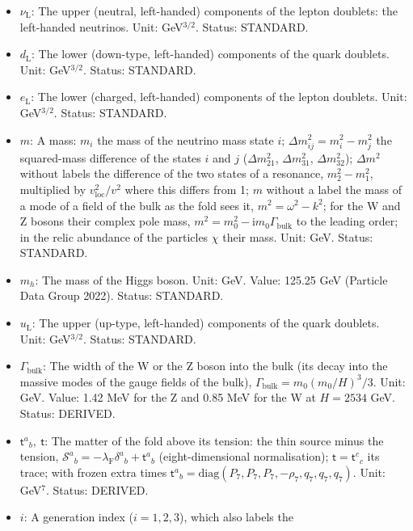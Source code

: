 \documentclass[
  10pt,
]{article}
\begin{document}
\begin{itemize}
  entries. Status: STANDARD.
\item
  \(\nu_{\mathrm{L}}\): The upper (neutral, left-handed) components of
  the lepton doublets: the left-handed neutrinos. Unit: GeV\(^{3/2}\).
  Status: STANDARD.
\item
  \(d_{\mathrm{L}}\): The lower (down-type, left-handed) components of
  the quark doublets. Unit: GeV\(^{3/2}\). Status: STANDARD.
\item
  \(e_{\mathrm{L}}\): The lower (charged, left-handed) components of the
  lepton doublets. Unit: GeV\(^{3/2}\). Status: STANDARD.
\item
  \(m\): A mass: \(m_i\) the mass of the neutrino mass state \(i\);
  \(\Delta m_{ij}^2 = m_i^2 - m_j^2\) the squared-mass difference of the
  states \(i\) and \(j\) (\(\Delta m_{21}^2\), \(\Delta m_{31}^2\),
  \(\Delta m_{32}^2\)); \(\Delta m^2\) without labels the difference of
  the two states of a resonance, \(m_2^2 - m_1^2\), multiplied by
  \(v_{\mathrm{loc}}^2/v^2\) where this differs from 1; \(m\) without a
  label the mass of a mode of a field of the bulk as the fold sees it,
  \(m^2 = \omega^2 - k^2\); for the W and Z bosons their complex pole
  mass, \(m^2 = m_0^2 - \mathrm{i}m_0\Gamma_{\mathrm{bulk}}\) to the
  leading order; in the relic abundance of the particles \(\chi\) their
  mass. Unit: GeV. Status: STANDARD.
\item
  \(m_h\): The mass of the Higgs boson. Unit: GeV. Value: 125.25 GeV
  (Particle Data Group 2022). Status: STANDARD.
\item
  \(u_{\mathrm{L}}\): The upper (up-type, left-handed) components of the
  quark doublets. Unit: GeV\(^{3/2}\). Status: STANDARD.
\item
  \(\Gamma_{\mathrm{bulk}}\): The width of the W or the Z boson into the
  bulk (its decay into the massive modes of the gauge fields of the
  bulk), \(\Gamma_{\mathrm{bulk}} = m_0(m_0/H)^3/3\). Unit: GeV. Value:
  1.42 MeV for the Z and 0.85 MeV for the W at \(H = 2534\) GeV. Status:
  DERIVED.
\item
  \(\mathsf{t}^a{}_b,\ \mathsf{t}\): The matter of the fold above its
  tension: the thin source minus the tension,
  \(\mathcal{S}^a{}_b = -\lambda_{\mathrm{F}}\delta^a{}_b + \mathsf{t}^a{}_b\)
  (eight-dimensional normalisation); \(\mathsf{t} = \mathsf{t}^c{}_c\)
  its trace; with frozen extra times
  \(\mathsf{t}^a{}_b = \mathrm{diag}(P_7, P_7, P_7, -\rho_7, q_7, q_7, q_7)\).
  Unit: GeV\(^7\). Status: DERIVED.
\item
  \(i\): A generation index (\(i = 1, 2, 3\)), which also labels the

\end{itemize}
\end{document}
